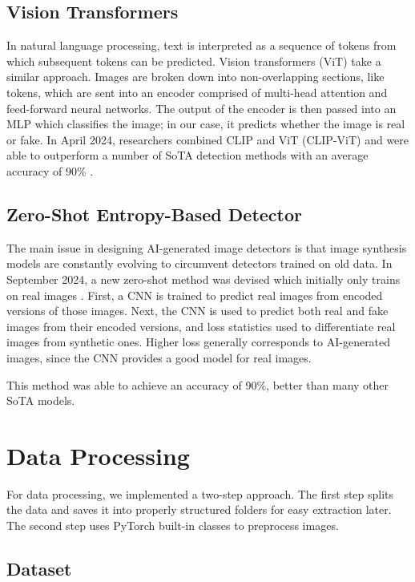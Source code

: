 \documentclass{article} %
\begin{document}
\subsection{Vision Transformers}

In natural language processing, text is interpreted as a sequence of tokens from which subsequent tokens can be predicted. Vision transformers (ViT) take a similar approach. Images are broken down into non-overlapping sections, like tokens, which are sent into an encoder comprised of multi-head attention and feed-forward neural networks. The output of the encoder is then passed into an MLP which classifies the image; in our case, it predicts whether the image is real or fake. In April 2024, researchers combined CLIP and ViT (CLIP-ViT) and were able to outperform a number of SoTA detection methods with an average accuracy of 90\% \citep{cozzolino2024raisingbaraigeneratedimage}.

\subsection{Zero-Shot Entropy-Based Detector}
\label{ZED}

The main issue in designing AI-generated image detectors is that image synthesis models are constantly evolving to circumvent detectors trained on old data. In September 2024, a new zero-shot method was devised which initially only trains on real images \citep{cozzolino2024zeroshotdetectionaigeneratedimages}. First, a CNN is trained to predict real images from encoded versions of those images. Next, the CNN is used to predict both real and fake images from their encoded versions, and loss statistics used to differentiate real images from synthetic ones. Higher loss generally corresponds to AI-generated images, since the CNN provides a good model for real images.

This method was able to achieve an accuracy of 90\%, better than many other SoTA models.

\section{Data Processing}

For data processing, we implemented a two-step approach. The first step splits the data and saves it into properly structured folders for easy extraction later. The second step uses PyTorch built-in classes to preprocess images.
\subsection{Dataset}
\end{document}
